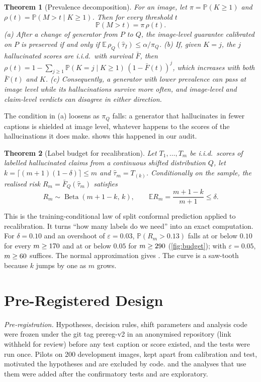 \documentclass[journal]{IEEEtran}
\newif\ifanon\anontrue
\newtheorem{theorem}{Theorem}
\theoremstyle{remark}\newtheorem{remark}{Remark}
\DeclareMathOperator{\Beta}{Beta}
\newcommand{\Sbar}{\bar F}
\renewcommand{\Pr}{\mathbb{P}}
\newcommand{\E}{\mathbb{E}}
\newcommand{\repo}{\ifanon an anonymised repository (link withheld for review)\else
  \url{https://github.com/antonyjasfer/Budget-Coupled-Robust-Belief-Propagation-for-Visual-Hallucination-Detection}\fi}
\begin{document}
\begin{theorem}[Prevalence decomposition]\label{thm:prev}
For an image, let $\pi=\Pr(K\ge1)$ and $\rho(t)=\Pr(M>t\mid K\ge1)$. Then for every threshold $t$
\begin{equation}\label{eq:prev}
\Pr(M>t)=\pi\,\rho(t).
\end{equation}
(a) After a change of generator from $P$ to $Q$, the image-level guarantee calibrated on $P$ is preserved if and only if $\E\,\rho_Q(\hat\tau_I)\le\alpha/\pi_Q$.
(b) If, given $K=j$, the $j$ hallucinated scores are i.i.d.\ with survival $\Sbar$, then $\rho(t)=1-\sum_{j\ge1}\Pr(K=j\mid K\ge1)\,(1-\Sbar(t))^{j}$, which increases with both $\Sbar(t)$ and $K$.
(c) Consequently, a generator with lower prevalence can pass at image level while its hallucinations survive more often, and image-level and claim-level verdicts can disagree in either direction.
\end{theorem}
The condition in (a) loosens as $\pi_Q$ falls: a generator that hallucinates in fewer captions is shielded at image level, whatever happens to the scores of the hallucinations it does make.  shows this happened in our audit.

\begin{theorem}[Label budget for recalibration]\label{thm:budget}
Let $T_1,\dots,T_m$ be i.i.d.\ scores of labelled hallucinated claims from a continuous shifted distribution $Q$, let $k=\lceil(m+1)(1-\delta)\rceil\le m$ and $\hat\tau_m=T_{(k)}$. Conditionally on the sample, the realised risk $R_m=\Sbar_Q(\hat\tau_m)$ satisfies
\begin{equation}\label{eq:beta}
R_m\sim\Beta(m+1-k,\,k),\qquad \E R_m=\frac{m+1-k}{m+1}\le\delta .
\end{equation}
\end{theorem}
This is the training-conditional law of split conformal prediction \cite{vovk2012conditional} applied to recalibration. It turns ``how many labels do we need'' into an exact computation. For $\delta=0.10$ and an overshoot of $\varepsilon=0.03$, $\Pr(R_m>0.13)$ falls at or below $0.10$ for every $m\ge170$ and at or below $0.05$ for $m\ge290$ (\cref{fig:budget}); with $\varepsilon=0.05$, $m\ge60$ suffices. The normal approximation gives \NormalApproxBudget. The curve is a saw-tooth because $k$ jumps by one as $m$ grows.

\section{Pre-Registered Design}\label{sec:design}
\emph{Pre-registration.} Hypotheses, decision rules, shift parameters and analysis code were frozen under the git tag prereg-v2 in \repo{} before any test caption or score existed, and the tests were run once. Pilots on 200 development images, kept apart from calibration and test, motivated the hypotheses and are excluded by code.  and the analyses that use them were added after the confirmatory tests and are exploratory.
\end{document}
